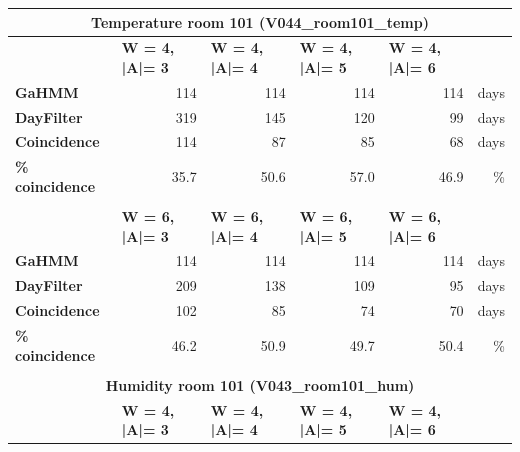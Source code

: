 \begin{table}[htbp]
\begin{tabular}{|l|r|r|r|r|r|}
    \multicolumn{6}{c}{\textbf{Temperature room 101 (V044\_room101\_temp)}} \bigstrut[b]\\
    \hline
         & \multicolumn{1}{l|}{\textbf{W = 4, |A|= 3}} & \multicolumn{1}{l|}{\textbf{W = 4, |A|= 4}} & \multicolumn{1}{l|}{\textbf{W = 4, |A|= 5}} & \multicolumn{1}{l|}{\textbf{W = 4, |A|= 6}} &  \bigstrut\\
    \hline
    \textbf{GaHMM} & 114  & 114  & 114  & 114  & days \bigstrut\\
    \hline
    \textbf{DayFilter} & 319  & 145  & 120  & 99   & days \bigstrut\\
    \hline
    \textbf{Coincidence} & 114  & 87   & 85   & 68   & days \bigstrut\\
    \hline
    \textbf{\% coincidence} & \cellcolor[rgb]{ .969,  .914,  .518} 35.7 & \cellcolor[rgb]{ .565,  .796,  .494} 50.6 & \cellcolor[rgb]{ .388,  .745,  .482} 57.0 & \cellcolor[rgb]{ .667,  .827,  .502} 46.9 & \% \bigstrut\\
    \hline
    \multicolumn{1}{r}{} & \multicolumn{1}{r}{} & \multicolumn{1}{r}{} & \multicolumn{1}{r}{} & \multicolumn{1}{r}{} & \multicolumn{1}{r}{} \bigstrut\\
    \hline
         & \multicolumn{1}{l|}{\textbf{W = 6, |A|= 3}} & \multicolumn{1}{l|}{\textbf{W = 6, |A|= 4}} & \multicolumn{1}{l|}{\textbf{W = 6, |A|= 5}} & \multicolumn{1}{l|}{\textbf{W = 6, |A|= 6}} &  \bigstrut\\
    \hline
    \textbf{GaHMM} & 114  & 114  & 114  & 114  & days \bigstrut\\
    \hline
    \textbf{DayFilter} & 209  & 138  & 109  & 95   & days \bigstrut\\
    \hline
    \textbf{Coincidence} & 102  & 85   & 74   & 70   & days \bigstrut\\
    \hline
    \textbf{\% coincidence} & \cellcolor[rgb]{ .686,  .831,  .502} 46.2 & \cellcolor[rgb]{ .557,  .796,  .494} 50.9 & \cellcolor[rgb]{ .588,  .804,  .494} 49.7 & \cellcolor[rgb]{ .573,  .8,  .494} 50.4 & \% \bigstrut\\
    \hline
    \multicolumn{1}{r}{} & \multicolumn{1}{r}{} & \multicolumn{1}{r}{} & \multicolumn{1}{r}{} & \multicolumn{1}{r}{} & \multicolumn{1}{r}{} \bigstrut[t]\\
    \multicolumn{6}{c}{\textbf{Humidity room 101 (V043\_room101\_hum)}} \bigstrut[b]\\
    \hline
         & \multicolumn{1}{l|}{\textbf{W = 4, |A|= 3}} & \multicolumn{1}{l|}{\textbf{W = 4, |A|= 4}} & \multicolumn{1}{l|}{\textbf{W = 4, |A|= 5}} & \multicolumn{1}{l|}{\textbf{W = 4, |A|= 6}} &  \bigstrut\\

\end{tabular}
\end{table}
